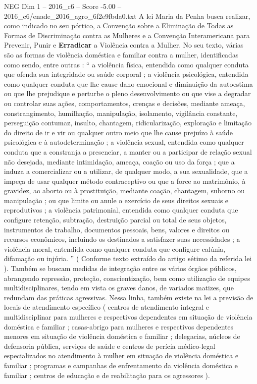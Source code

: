 \begin{textsample}{NEG Dim 1 – 2016\_c6 – Score -5.00 – 2016\_c6/enade\_2016\_agro\_6f2e9fbda0.txt}
A lei Maria da Penha busca realizar, como indicado no seu pórtico, a Convenção sobre a Eliminação de Todas as Formas de Discriminação contra as Mulheres e a Convenção Interamericana para Prevenir, Punir e \textbf{Erradicar} a Violência contra a Mulher.
No seu texto, várias são as formas de violência doméstica e familiar contra a mulher, identificadas como sendo, entre outras : “ a violência física, entendida como qualquer conduta que ofenda sua integridade ou saúde corporal ; a violência psicológica, entendida como qualquer conduta que lhe cause dano emocional e diminuição da autoestima ou que lhe prejudique e perturbe o pleno desenvolvimento ou que vise a degradar ou controlar suas ações, comportamentos, crenças e decisões, mediante ameaça, constrangimento, humilhação, manipulação, isolamento, vigilância constante, perseguição contumaz, insulto, chantagem, ridicularização, exploração e limitação do direito de ir e vir ou qualquer outro meio que lhe cause prejuízo à saúde psicológica e à autodeterminação ; a violência sexual, entendida como qualquer conduta que a constranja a presenciar, a manter ou a participar de relação sexual não desejada, mediante intimidação, ameaça, coação ou uso da força ; que a induza a comercializar ou a utilizar, de qualquer modo, a sua sexualidade, que a impeça de usar qualquer método contraceptivo ou que a force ao matrimônio, à gravidez, ao aborto ou à prostituição, mediante coação, chantagem, suborno ou manipulação ; ou que limite ou anule o exercício de seus direitos sexuais e reprodutivos ; a violência patrimonial, entendida como qualquer conduta que configure retenção, subtração, destruição parcial ou total de seus objetos, instrumentos de trabalho, documentos pessoais, bens, valores e direitos ou recursos econômicos, incluindo os destinados a satisfazer suas necessidades ; a violência moral, entendida como qualquer conduta que configure calúnia, difamação ou injúria. ” ( Conforme texto extraído do artigo sétimo da referida lei ).
Também se buscam medidas de integração entre os vários órgãos públicos, abrangendo repressão, proteção, conscientização, bem como utilização de equipes multidisciplinares, tendo em vista os graves danos, de variados matizes, que redundam das práticas agressivas.
Nessa linha, também existe na lei a previsão de locais de atendimento específico ( centros de atendimento integral e multidisciplinar para mulheres e respectivos dependentes em situação de violência doméstica e familiar ; casas-abrigo para mulheres e respectivos dependentes menores em situação de violência doméstica e familiar ; delegacias, núcleos de defensoria pública, serviços de saúde e centros de perícia médico-legal especializados no atendimento à mulher em situação de violência doméstica e familiar ; programas e campanhas de enfrentamento da violência doméstica e familiar ; centros de educação e de reabilitação para os agressores ).

\end{textsample}
